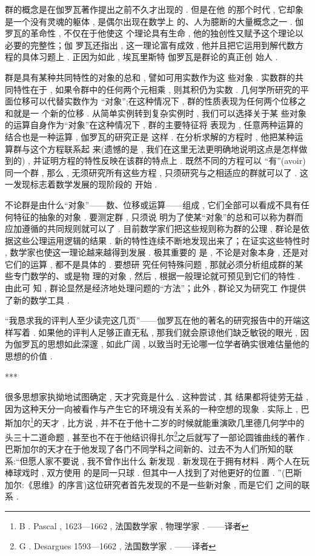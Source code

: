 群的概念是在伽罗瓦著作提出之前不久才出现的 . 但是在他 的那个时代 , 它却象是一个没有灵魂的躯体 , 是偶尔出现在数学上 的、人为臆断的大量概念之一 . 伽罗瓦的革命性 , 不仅在于他使这 个理论具有生命 , 他的独创性又赋予这个理论以必要的完整性；伽 罗瓦还指出 , 这一理论富有成效 , 他并且把它运用到解代数方程的具体习题上 . 正因为如此 , 埃瓦里斯特 \textbullet 伽罗瓦是群论的真正创 始人 . 

群是具有某种共同特性的对象的总和 , 譬如可用实数作为这 些对象 . 实数群的共同特性在于 , 如果令群中的任何两个元相乘 ,  则其积仍为实数 . 几何学所研究的平面位移可以代替实数作为 “对象”;在这种情况下 , 群的性质表现为任何两个位移之和就是一 个新的位移 . 从简单实例转到复杂实例时 , 我们可以选择关于某 些对象的运算自身作为“对象”在这种情况下 , 群的主要特征将 表现为 , 任意两种运算的结合也是一种运算 , 伽罗瓦的研究正是 这样 . 在分析求解的方程时 , 他把某种运算群与这个方程联系起 来(遗憾的是 , 我们在这里无法更明确地说明这点是怎样做到的) ,  并证明方程的特性反映在该群的特点上 . 既然不同的方程可以 “有”(avoir)同一个群 , 那么 , 无须研究所有这些方程 , 只须研究与之相适应的群就可以了 . 这一发现标志着数学发展的现阶段的
开始 . 

不论群是由什么“对象”——数、位移或运算——组成 , 它们全部可以看成不具有任何特征的抽象的对象 . 要测定群 , 只须说 明为了使某“对象”的总和可以称为群而应加遵循的共同规则就可以了 . 目前数学家们把这些规则称为群的公理 , 群论是依据这些公理运用逻辑的结果 . 新的特性连续不断地发现出来了；在证实这些特性时 , 数学家也使这一理论越来越得到发展 . 极其重要的 是 , 不论是对象本身 , 还是对它们的运算 , 都不是具体的 . 要想研 究任何特殊问题 , 那就必须分析组成群的某些专门数学的、或是物 理的对象 , 然后 , 根据一般理论就可预见到它们的特性 . 由此可 知 , 群论显然是经济地处理问题的“方法”；此外 , 群论又为研究工 作提供了新的数学工具 . 

“我恳求我的评判人至少读完这几页”——伽罗瓦在他的著名的研究报告中的开端这样写着 . 如果他的评判人足够正直无私 , 那我们就会原谅他们缺乏敏锐的眼光 , 因为伽罗瓦的思想如此深邃 , 如此广阔 , 以致当时无论哪一位学者确实很难估量他的思想的价值 . 

\begin{center}***
\end{center}

很多思想家执拗地试图确定 , 天才究竟是什么 . 这种尝试 , 其 结果都将徒劳无益 , 因为这种天分一向被看作与产生它的环境没有关系的一种空想的现象 . 实际上 , 巴斯加尔\footnote{B . Pascal , 1623—1662 , 法国数学家 , 物理学家 . ——译者}的天才 , 比方说 ,  并不在于他十二岁的时候就能重演欧几里德几何学中的头三十二道命题 , 甚至也不在于他结识得扎尔\footnote{G . Desargues 1593—1662 , 法国数学家 . ——译者}之后就写了一部论圆锥曲线的著作 . 巴斯加尔的天才在于他发现了各门不同学科之间新的、过去不为人们所知的联系:“但愿人家不要说 , 我不曾作出什么 新发现 . 新发现在于拥有材料 . 两个人在玩棒球戏时 , 双方使用 的是同一只球 . 但其中一人找到了对他更好的位置 . ”(巴斯加尔:《思维》的序言)这位研究者首先发现的不是一些新对象 , 而是它们 之间的联系 . 

